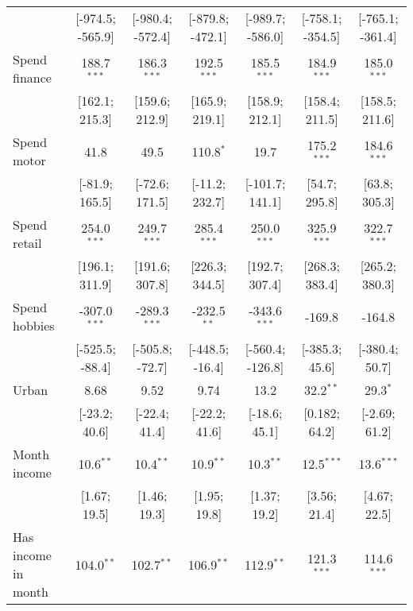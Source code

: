 \begin{table}[htbp]
\begin{threeparttable}[b]
\begin{tabular}{lcccccc}
                                   & [-974.5; -565.9] & [-980.4; -572.4] & [-879.8; -472.1] & [-989.7; -586.0] & [-758.1; -354.5] & [-765.1; -361.4]\\   
         Spend finance             & 188.7$^{***}$    & 186.3$^{***}$    & 192.5$^{***}$    & 185.5$^{***}$    & 184.9$^{***}$    & 185.0$^{***}$\\   
                                   & [162.1; 215.3]   & [159.6; 212.9]   & [165.9; 219.1]   & [158.9; 212.1]   & [158.4; 211.5]   & [158.5; 211.6]\\   
         Spend motor               & 41.8             & 49.5             & 110.8$^{*}$      & 19.7             & 175.2$^{***}$    & 184.6$^{***}$\\   
                                   & [-81.9; 165.5]   & [-72.6; 171.5]   & [-11.2; 232.7]   & [-101.7; 141.1]  & [54.7; 295.8]    & [63.8; 305.3]\\   
         Spend retail              & 254.0$^{***}$    & 249.7$^{***}$    & 285.4$^{***}$    & 250.0$^{***}$    & 325.9$^{***}$    & 322.7$^{***}$\\   
                                   & [196.1; 311.9]   & [191.6; 307.8]   & [226.3; 344.5]   & [192.7; 307.4]   & [268.3; 383.4]   & [265.2; 380.3]\\   
         Spend hobbies             & -307.0$^{***}$   & -289.3$^{***}$   & -232.5$^{**}$    & -343.6$^{***}$   & -169.8           & -164.8\\   
                                   & [-525.5; -88.4]  & [-505.8; -72.7]  & [-448.5; -16.4]  & [-560.4; -126.8] & [-385.3; 45.6]   & [-380.4; 50.7]\\   
         Urban                     & 8.68             & 9.52             & 9.74             & 13.2             & 32.2$^{**}$      & 29.3$^{*}$\\   
                                   & [-23.2; 40.6]    & [-22.4; 41.4]    & [-22.2; 41.6]    & [-18.6; 45.1]    & [0.182; 64.2]    & [-2.69; 61.2]\\   
         Month income              & 10.6$^{**}$      & 10.4$^{**}$      & 10.9$^{**}$      & 10.3$^{**}$      & 12.5$^{***}$     & 13.6$^{***}$\\   
                                   & [1.67; 19.5]     & [1.46; 19.3]     & [1.95; 19.8]     & [1.37; 19.2]     & [3.56; 21.4]     & [4.67; 22.5]\\   
         Has income in month       & 104.0$^{**}$     & 102.7$^{**}$     & 106.9$^{**}$     & 112.9$^{**}$     & 121.3$^{***}$    & 114.6$^{***}$\\   

\end{tabular}
\end{threeparttable}
\end{table}
